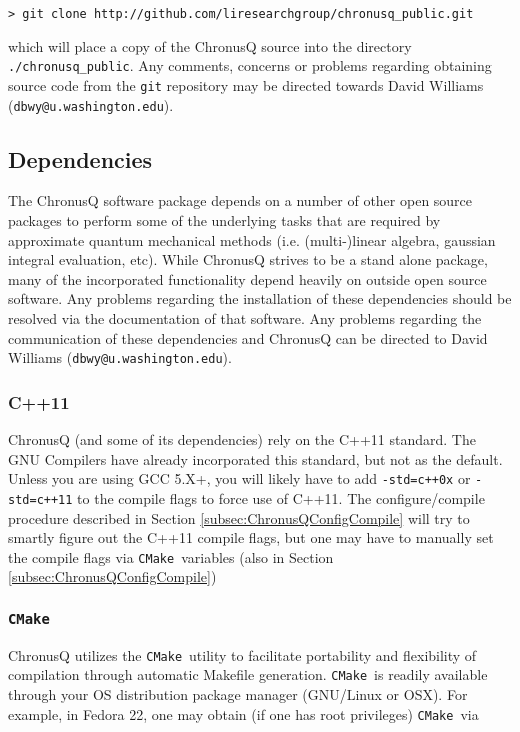 \documentclass[12pt]{article}
\makeatletter
\newcommand{\DBWYContact}{David Williams (\texttt{dbwy@u.washington.edu})}
\newcommand{\CMake}{\texttt{CMake}}
\makeatother
\begin{document}
    \begin{lstlisting}
> git clone http://github.com/liresearchgroup/chronusq_public.git
    \end{lstlisting}
    
    \noindent which will place a copy of the ChronusQ source into the directory 
    \texttt{./chronusq\_public}. Any comments, concerns or problems regarding 
    obtaining source code from the \texttt{git} repository may be directed 
    towards \DBWYContact. 

    \subsection{Dependencies} \label{subsec:ChronusQDeps}

    The ChronusQ software package depends on a number of other open source packages
    to perform some of the underlying tasks that are required by approximate
    quantum mechanical methods (i.e. (multi-)linear algebra, gaussian integral 
    evaluation, etc). While ChronusQ strives to be a stand alone package, many
    of the incorporated functionality depend heavily on outside open source 
    software. Any problems regarding the installation of these dependencies should
    be resolved via the documentation of that software. Any problems regarding the
    communication of these dependencies and ChronusQ can be directed to
    \DBWYContact.
    
      \subsubsection{C++11} \label{subsubsec:C++11} 
        ChronusQ (and some of its dependencies) rely on the C++11 
        standard. The GNU Compilers have already incorporated this standard, but
	not as the default. Unless you are using GCC 5.X+, you will likely have
	to add \texttt{-std=c++0x} or \texttt{-std=c++11} to the compile flags
	to force use of C++11. The configure/compile procedure described in
	Section \ref{subsec:ChronusQConfigCompile} will try to smartly figure out
	the C++11 compile flags, but one may have to manually set the compile flags
	via \CMake~variables (also in Section \ref{subsec:ChronusQConfigCompile})

      \subsubsection{\CMake} \label{subsubsec:cmake} 
        ChronusQ utilizes the \CMake~utility to facilitate
        portability and flexibility of compilation through automatic Makefile 
	generation. \CMake~is readily available through your OS distribution
	package manager (GNU/Linux or OSX). For example, in Fedora 22, one may 
	obtain (if one has root privileges) \CMake~via
\end{document}
